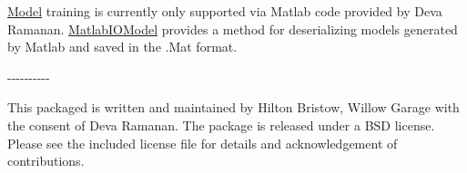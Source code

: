 \hyperlink{classModel}{\-Model} training is currently only supported via \-Matlab code provided by \-Deva \-Ramanan. \hyperlink{classMatlabIOModel}{\-Matlab\-I\-O\-Model} provides a method for deserializing models generated by \-Matlab and saved in the .\-Mat format.

-\/-\/-\/-\/-\/-\/-\/-\/-\/-\/

\-This packaged is written and maintained by \-Hilton \-Bristow, \-Willow \-Garage with the consent of \-Deva \-Ramanan. \-The package is released under a \-B\-S\-D license. \-Please see the included license file for details and acknowledgement of contributions. 